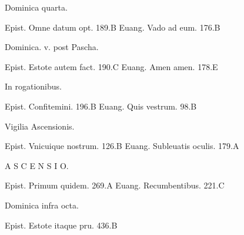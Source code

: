 \documentclass[a5paper,10pt]{book}
\begin{document}
\begin{multicols}{2}
\begin{center}
\color{red} Dominica quarta.
\end{center}
\vspace{-.75em}
\par \noindent Epist. Omne datum opt. \hfill 189.B
\newline Euang. Vado ad eum. \hfill 176.B
\newline \vspace{-1.75em}
\begin{center}
\color{red} Dominica. v. post Pascha.
\end{center}
\vspace{-.75em}
\par \noindent Epist. Estote autem fact. \hfill 190.C
\newline Euang. Amen amen. \hfill 178.E
\newline \vspace{-1.75em}
\begin{center}
\color{red} In rogationibus.
\end{center}
\vspace{-.75em}
\par \noindent Epist. Confitemini. \hfill 196.B
\newline Euang. Quis vestrum. \hfill 98.B
\newline \vspace{-1.75em}
\begin{center}
\color{red} Vigilia Ascensionis.
\end{center}
\vspace{-.75em}
\par \noindent Epist. Vnicuique nostrum. \hfill 126.B
\newline Euang. Subleuatis oculis. \hfill 179.A
\newline \vspace{-1.25em}
\begin{center}
\color{red} \large A S C E N S I O.
\end{center}
\vspace{-.25em}
\par \noindent Epist. Primum quidem. \hfill 269.A
\newline Euang. Recumbentibus. \hfill 221.C
\newline \vspace{-1.75em}
\begin{center}
\color{red} Dominica infra octa.
\end{center}
\vspace{-.75em}
\par \noindent Epist. Estote itaque pru. \hfill 436.B

\end{multicols}
\end{document}
